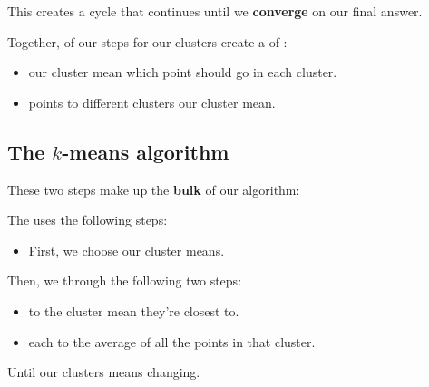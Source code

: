        This creates a cycle that continues until we \textbf{converge} on our final answer.\\
        
        \begin{concept}
            Together, of our steps for  our clusters create a  of :
            
            \begin{itemize}
                \item {} our cluster mean  which point should go in each cluster.
                
                \item {} points to different clusters  our cluster mean.
            \end{itemize}
        \end{concept}
        
    \subsection{The $k$-means algorithm}
    
        These two steps make up the \textbf{bulk} of our algorithm:\\
        
        \begin{definition}
            The  uses the following steps:
            
            \begin{itemize}
                \item First, we  choose our  cluster means.
            \end{itemize} 
            
            Then, we  through the following two steps:
            
            \begin{itemize}
                \item {}  to the cluster mean they're closest to.
                
                \item {} each  to the average of all the points in that cluster.
            \end{itemize}
            
            Until our clusters means  changing.
        \end{definition}
        
